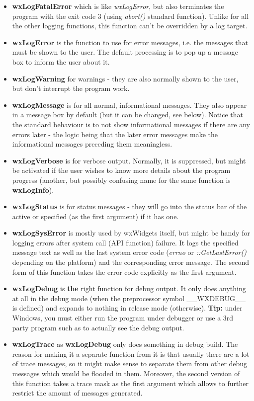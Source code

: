 \begin{itemize}\itemsep=0pt
\item{\bf wxLogFatalError} which is like {\it wxLogError}, but also
terminates the program with the exit code $3$ (using {\it abort()} standard
function). Unlike for all the other logging functions, this function can't be
overridden by a log target.
\item{\bf wxLogError} is the function to use for error messages, i.e. the
messages that must be shown to the user. The default processing is to pop up a
message box to inform the user about it.
\item{\bf wxLogWarning} for warnings - they are also normally shown to the
user, but don't interrupt the program work.
\item{\bf wxLogMessage} is for all normal, informational messages. They also
appear in a message box by default (but it can be changed, see below). Notice
that the standard behaviour is to not show informational messages if there are
any errors later - the logic being that the later error messages make the
informational messages preceding them meaningless.
\item{\bf wxLogVerbose} is for verbose output. Normally, it is suppressed, but
might be activated if the user wishes to know more details about the program
progress (another, but possibly confusing name for the same function is {\bf
wxLogInfo}).
\item{\bf wxLogStatus} is for status messages - they will go into the status
bar of the active or specified (as the first argument)  if it has one.
\item{\bf wxLogSysError} is mostly used by wxWidgets itself, but might be
handy for logging errors after system call (API function) failure. It logs the
specified message text as well as the last system error
code ({\it errno} or {\it ::GetLastError()} depending on the platform) and
the corresponding error message. The second form of this function takes the
error code explicitly as the first argument.
\item{\bf wxLogDebug} is {\bf the} right function for debug output. It only
does anything at all in the debug mode (when the preprocessor symbol
\_\_WXDEBUG\_\_ is defined) and expands to nothing in release mode (otherwise).
{\bf Tip:} under Windows, you must either run the program under debugger or
use a 3rd party program such as  
to actually see the debug output.
\item{\bf wxLogTrace} as {\bf wxLogDebug} only does something in debug
build. The reason for making it a separate function from it is that usually
there are a lot of trace messages, so it might make sense to separate them
from other debug messages which would be flooded in them. Moreover, the second
version of this function takes a trace mask as the first argument which allows
to further restrict the amount of messages generated.
\end{itemize}

